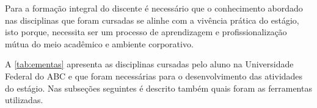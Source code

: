 \documentclass[
  12pt,				%
  openany,
  oneside,
  a4paper,			%
  english,			%
  brazil
]{article}
\numberwithin{figure}{section}
\numberwithin{table}{section}
\begin{document}
Para a formação integral do discente é necessário que o conhecimento abordado nas disciplinas que foram cursadas se alinhe com a vivência prática do estágio, isto porque, necessita ser um processo de aprendizagem e profissionalização mútua do meio acadêmico e ambiente corporativo.

A \autoref{tab:ementas} apresenta as disciplinas cursadas pelo aluno na Universidade Federal do ABC e que foram necessárias para o desenvolvimento das atividades do estágio. Nas subseções seguintes é descrito também quais foram as ferramentas utilizadas.

%
%
%
%
%
%
%
%
%
%
%
%
\end{document}
